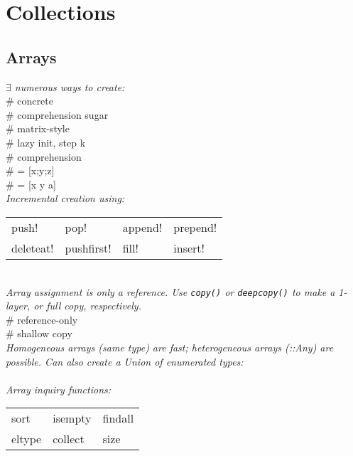\section{Collections}

\subsection*{Arrays}
\textit{$\exists$ numerous ways to create:}\\
 \# concrete \\
 \# comprehension sugar \\
 \# matrix-style \\
 \# lazy init, step k \\
\mycolX{30mm}{\code{[f(i) for i in 1:10]}} \# comprehension \\
 \# = [x;y;z] \\
 \# = [x y a]  \\[2mm]
\textit{Incremental creation using:}\\
\begin{tabular}{l l l l}
    push!       & pop!      & append! & prepend! \\
    deleteat!   & pushfirst! & fill! & insert! \\
\end{tabular} \ \\

\textit{Array assignment is only a reference. Use \texttt{copy()} or \texttt{deepcopy()} to make a 1-layer, or full copy, respectively.}\\
 \# reference-only \\
 \# shallow copy \\[2mm]
\textit{Homogeneous arrays (same type) are fast; heterogeneous arrays (::Any) are possible. Can also create a Union of enumerated types:}\\
 \\[2mm]
\textit{Array inquiry functions:}\\
\begin{tabular}{l l l}
    sort    &       isempty         & findall \\
    eltype & collect & size \\
\end{tabular} \

